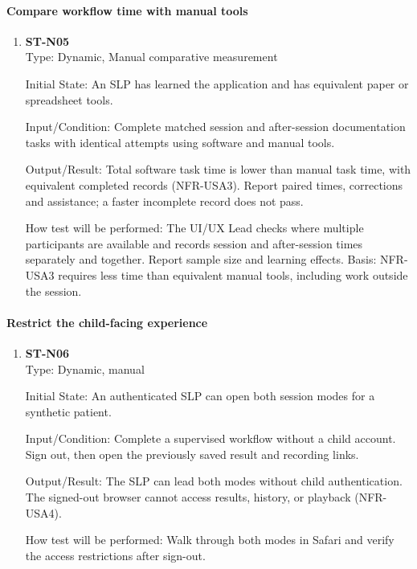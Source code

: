 \documentclass[12pt, titlepage]{article}
\begin{document}
\paragraph{Compare workflow time with manual tools}
\begin{enumerate}
    \item \textbf{ST-N05}\\
    Type: Dynamic, Manual comparative measurement

    Initial State: An SLP has learned the application and has equivalent paper
    or spreadsheet tools.

    Input/Condition: Complete matched session and after-session documentation
    tasks with identical attempts using software and manual tools.

    Output/Result: Total software task time is lower than manual task time,
    with equivalent completed records (NFR-USA3). Report paired times,
    corrections and assistance; a faster incomplete record does not pass.

    How test will be performed: The UI/UX Lead checks
    where multiple participants are available and records session and
    after-session times separately and together. Report sample size and
    learning effects. Basis: NFR-USA3 requires less time than equivalent manual
    tools, including work outside the session.
\end{enumerate}

\paragraph{Restrict the child-facing experience}
\begin{enumerate}
    \item \textbf{ST-N06}\\

    Type: Dynamic, manual

    Initial State: An authenticated SLP can open both session modes for a synthetic patient.

    Input/Condition: Complete a supervised workflow without a child account. Sign out, then open the previously saved result and recording links.

    Output/Result: The SLP can lead both modes without child authentication. The signed-out browser cannot access results, history, or playback (NFR-USA4).

    How test will be performed: Walk through both modes in Safari and verify the access restrictions after sign-out.

\end{enumerate}
\end{document}
